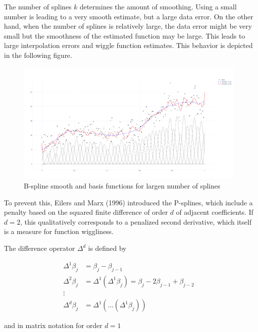 \documentclass[10pt,a4paper]{article}
\begin{document}
	The number of splines $k$ determines the amount of smoothing. Using a small number is leading to a very smooth estimate, but a large data error. On the other hand, when the number of splines is relatively large, the data error might be very small but the smoothness of the estimated function may be large. This leads to large interpolation errors and wiggle function estimates. This behavior is depicted in the following figure.

	\begin{figure}[H]
		\centering
		\includegraphics[width=\linewidth]{thesisplots/smooth_wiggly_plus_basis.pdf}
		\caption{B-spline smooth and basis functions for largen number of splines}
		\label{fig:smooth_bf_large}
	\end{figure}
	
	To prevent this, Eilers and Marx (1996) introduced the P-splines, which include a penalty based on the squared finite difference of order $d$ of adjacent coefficients. If $d=2$, this qualitatively  corresponds to a penalized second derivative, which itself is a measure for function wiggliness.
	
	The difference operator $\Delta^d$ is defined by
		
	\begin{equation}
	\begin{align*}
		\Delta^1 \beta_j &= \beta_j - \beta_{j-1} \\
		\Delta^2 \beta_j &= \Delta^1(\Delta^1 \beta_j) = \beta_j - 2\beta_{j-1} + \beta_{j-2} \\ 
	  	\vdots \\ 
	  	\Delta^d \beta_j &= \Delta^1(...(\Delta^1 \beta_j))
	\end{align*}
	\end{equation}
	
	and in matrix notation for order $d=1$
	
\end{document}
